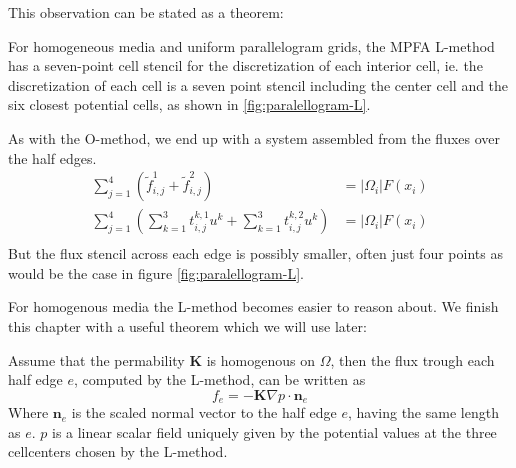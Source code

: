 \documentclass[../Main/main.tex]{subfiles}
\begin{document}
This observation can be stated as a theorem:
\begin{theorem}
	\label{th:L_triangulation}
	For homogeneous media and uniform parallelogram grids, the MPFA L-method
	has a seven-point cell stencil for the discretization of each interior cell, ie. the discretization of each cell is a seven point stencil including the center cell and the six closest potential cells, as shown in \ref{fig:paralellogram-L}.
\end{theorem}
As with the O-method, we end up with a system assembled from the fluxes over the half edges.
\begin{equation}
	\begin{aligned}
		\sum_{j=1}^4 (\tilde{f}_{i,j}^1 + \tilde{f}_{i,j}^2) &= |\Omega_i|F(x_i) \\
		\sum_{j=1}^4 (\sum_{k=1}^3 t^{k,1}_{i,j}u^k + \sum_{k=1}^3 t^{k,2}_{i,j}u^k)&= |\Omega_i|F(x_i)\\
	\end{aligned}
\end{equation}
But the flux stencil across each edge is possibly smaller, often just four points as would be the case in figure \ref{fig:paralellogram-L}. 
\par 
For homogenous media the L-method becomes easier to reason about. We finish this chapter with a useful theorem which we will use later:

	\begin{lemma} \label{lemma:L_potential}
		Assume that the permability $\pmb{K}$ is homogenous on $\Omega$, then the flux trough each half edge $e$, computed by the L-method, can be written as
		\begin{equation}
			f_e = -\pmb{K} \nabla p \cdot \pmb{n}_e
		\end{equation}
		Where $\pmb{n}_e$ is the scaled normal vector to the half edge $e$, having the same length as $e$. $p$ is a linear scalar field uniquely given by the potential values at the three cellcenters chosen by the L-method.
	\end{lemma}
\end{document}
